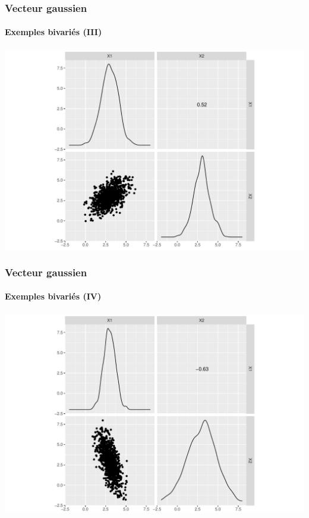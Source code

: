 \documentclass{beamer}\usepackage[]{graphicx}\usepackage[]{color}
\newenvironment{knitrout}{}{} %
\begin{document}
\begin{frame}[fragile]
  \frametitle{Vecteur gaussien}
  \framesubtitle{Exemples bivariés (III)}

\begin{knitrout}\scriptsize
{}\color{fgcolor}
\includegraphics[width=\textwidth]{figures/algebra-unnamed-chunk-6-1} 

\end{knitrout}

\end{frame}

\begin{frame}[fragile]
  \frametitle{Vecteur gaussien}
  \framesubtitle{Exemples bivariés (IV)}

\begin{knitrout}\scriptsize
{}\color{fgcolor}
\includegraphics[width=\textwidth]{figures/algebra-unnamed-chunk-7-1} 

\end{knitrout}

\end{frame}
\end{document}
